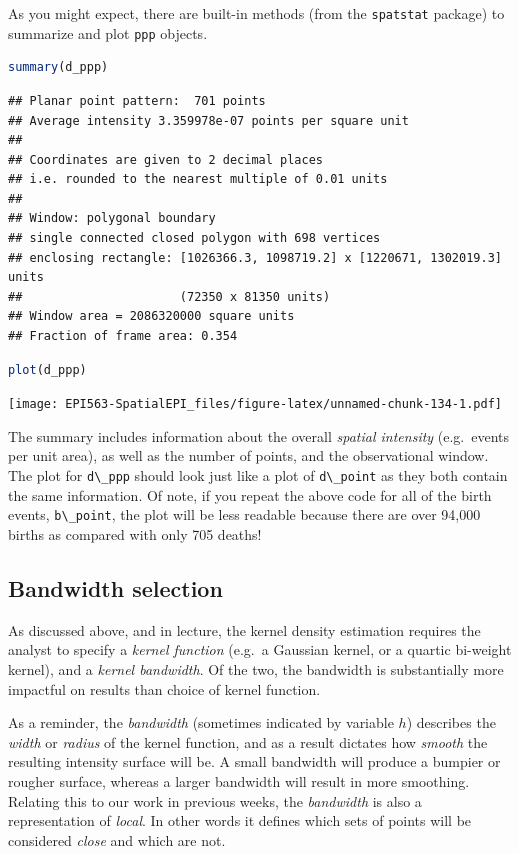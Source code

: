 \documentclass[
]{book}
\newcommand{\passthrough}[1]{#1}
\begin{document}
As you might expect, there are built-in methods (from the \passthrough{\lstinline!spatstat!} package) to summarize and plot \passthrough{\lstinline!ppp!} objects.

\begin{lstlisting}[language=R]
summary(d_ppp)
\end{lstlisting}

\begin{lstlisting}
## Planar point pattern:  701 points
## Average intensity 3.359978e-07 points per square unit
## 
## Coordinates are given to 2 decimal places
## i.e. rounded to the nearest multiple of 0.01 units
## 
## Window: polygonal boundary
## single connected closed polygon with 698 vertices
## enclosing rectangle: [1026366.3, 1098719.2] x [1220671, 1302019.3] units
##                      (72350 x 81350 units)
## Window area = 2086320000 square units
## Fraction of frame area: 0.354
\end{lstlisting}

\begin{lstlisting}[language=R]
plot(d_ppp)
\end{lstlisting}

\texttt{[image: EPI563-SpatialEPI\_files/figure-latex/unnamed-chunk-134-1.pdf]}

The summary includes information about the overall \emph{spatial intensity} (e.g.~events per unit area), as well as the number of points, and the observational window. The plot for \passthrough{\lstinline!d\_ppp!} should look just like a plot of \passthrough{\lstinline!d\_point!} as they both contain the same information. Of note, if you repeat the above code for all of the birth events, \passthrough{\lstinline!b\_point!}, the plot will be less readable because there are over 94,000 births as compared with only 705 deaths!

\hypertarget{bandwidth-selection}{%
\subsection{Bandwidth selection}\label{bandwidth-selection}}

As discussed above, and in lecture, the kernel density estimation requires the analyst to specify a \emph{kernel function} (e.g.~a Gaussian kernel, or a quartic bi-weight kernel), and a \emph{kernel bandwidth}. Of the two, the bandwidth is substantially more impactful on results than choice of kernel function.

As a reminder, the \emph{bandwidth} (sometimes indicated by variable \(h\)) describes the \emph{width} or \emph{radius} of the kernel function, and as a result dictates how \emph{smooth} the resulting intensity surface will be. A small bandwidth will produce a bumpier or rougher surface, whereas a larger bandwidth will result in more smoothing. Relating this to our work in previous weeks, the \emph{bandwidth} is also a representation of \emph{local}. In other words it defines which sets of points will be considered \emph{close} and which are not.
\end{document}
